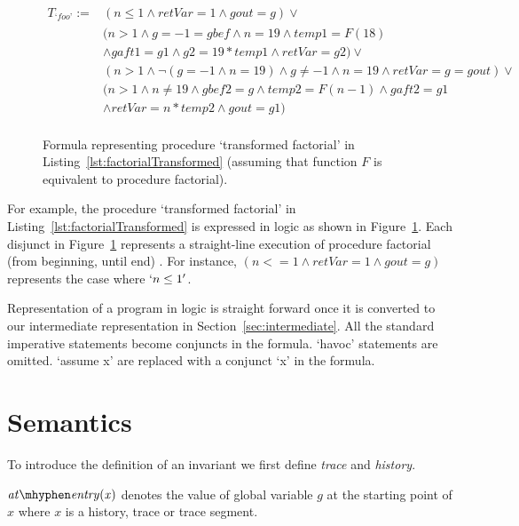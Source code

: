 \documentclass{llncs}
\newcommand{\foo}{\textit{`foo'}}
\newcommand{\pathCondition}{\mathit{T_{\foo}}}
\newcommand{\F}{\mathit{F}}
\newcommand{\g}{\textit{g}}
\newcommand{\atEntry}[1]{\mathit{at \mhyphen entry(#1)}}
\begin{document}
\begin{figure}
  \begin{align*}
    \pathCondition :=
    &(n \leq 1 \wedge retVar = 1 \wedge gout = g) \vee \\
    &(n > 1 \wedge g = -1 = gbef \wedge n = 19 \wedge temp1 = \F(18) \\
    \;&\wedge gaft1 = g1 \wedge g2 = 19 * temp1
    \wedge retVar = g2) \vee\\
    &(n > 1 \wedge \neg( g = -1 \wedge n = 19) \wedge g \neq -1
    \wedge n = 19 \wedge retVar = g = gout) \vee\\
    &(n > 1 \wedge n \neq 19 \wedge gbef2 = g \wedge temp2 = \F( n
    - 1) \wedge gaft2 = g1\\
    &\wedge retVar = n * temp2 \wedge gout = g1)\\
  \end{align*}
  \caption{Formula representing procedure `transformed factorial' in
    Listing~\ref{lst:factorialTransformed} (assuming that function
    $\F$ is equivalent to procedure factorial).}
  \label{fig:pathCondition}
\end{figure}

For example, the procedure `transformed factorial' in
Listing~\ref{lst:factorialTransformed} is expressed in logic as shown
in Figure~\ref{fig:pathCondition}. Each disjunct in
Figure~\ref{fig:pathCondition} represents a straight-line execution of
procedure factorial (from beginning, until end) . For instance, $(n <=
1 \wedge retVar = 1 \wedge gout = g)$ represents the case where $`n
\leq 1'$.

Representation of a program in logic is straight forward once it is
converted to our intermediate representation in
Section~\ref{sec:intermediate}. All the standard imperative statements
become conjuncts in the formula. `havoc' statements are omitted.
`assume x' are replaced with a conjunct `x' in the formula.

\section{Semantics}

To introduce the definition of an invariant we first define
\textit{trace} and \textit{history}.

\begin{definition} 
  $\\\atEntry{x}$ denotes the value of global variable $\g$ at the
  starting point of $x$ where $x$ is a history, trace or trace
  segment.
\end{definition}
\end{document}
